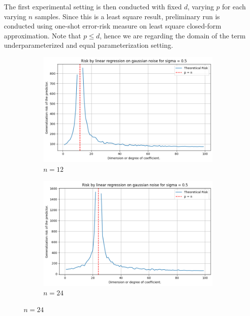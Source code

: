 \documentclass[10pt,oneside,oldfontcommands,dvipsnames,article]{memoir}
\begin{document}
The first experimental setting is then conducted with fixed $d$, varying $p$ for each varying $n$ samples. Since this is a least square result, preliminary run is conducted using one-shot error-risk measure on least square closed-form approximation. Note that $p\leq d$, hence we are regarding the domain of the term underparameterized and equal parameterization setting. 

\begin{figure}[htb]
  \centering
  \newcommand{\imgwidth}{0.24\textwidth}

  \begin{subfigure}[b]{\imgwidth}
    \includegraphics[width=\linewidth]{img/descent_lin_reg_1.png}
    \caption{$n=12$}\label{fig:1a}
  \end{subfigure}%
  \hfill
  \begin{subfigure}[b]{\imgwidth}
    \includegraphics[width=\linewidth]{img/descent_lin_reg_2.png}
    \caption{$n=24$}\label{fig:1b}
  \end{subfigure}%

\end{figure}
\end{document}
